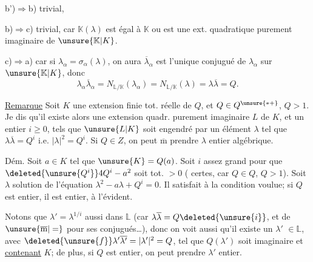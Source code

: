 b')$\Rightarrow$b) trivial, 

b)$\Rightarrow$c) trivial, car $\mathbb K(\lambda)$ est égal à $\mathbb K$ ou est une ext. quadratique purement imaginaire de $\unsure{\mathbb K|K}$.

c)$\Longrightarrow$a) car si $\lambda_\alpha=\sigma_\alpha(\lambda)$, on aura   $\overline\lambda_\alpha$ est l'unique \deleted{\unsure{$\lambda$}} conjugué de $\lambda_\alpha$ sur $\unsure{\mathbb K|K}$,  donc
\[
\lambda_\alpha\overline\lambda_\alpha=N_{\mathbb L/\mathbb K}(\lambda_\alpha)=N_{\mathbb L/\mathbb K}(\lambda)=\lambda\overline\lambda=Q.
\]


\uline{Remarque} Soit $K$ une extension finie tot. réelle de $Q$, et $Q\in Q^{\unsure{*+}}$, $Q>1$. Je dis qu'il existe alors une extension quadr. purement imaginaire $L$ de $K$,  et un entier $i\ge0$,  tels que $\unsure{L|K}$ soit engendré  par un élément $\lambda$ tel que $\lambda\overline\lambda=Q^i$ i.e. $|\lambda|^2=Q^i$. Si $Q\in Z$, on peut $\overline{\mathrm m}$ prendre $\lambda$ entier algébrique.

Dém. Soit $a\in K$ tel que $\unsure{K}=Q(a)$.  Soit $i$ assez grand pour que $\deleted{\unsure{Q^i}}4Q^i-a^2$ soit tot. $>0$ ( certes, car $Q\in Q$, $Q>1$). Soit $\lambda$ solution de l'équation $\lambda^2-a\lambda+Q^i=0$. Il satisfait à la condition voulue; si $Q$ est entier, il est entier, à l'évident.

Notons que $\lambda'=\lambda^{1/i}$  aussi dans $\mathbb L$ (car $\lambda\overline\lambda=Q\deleted{\unsure{i}}$, et de $\unsure{\overline{\mathrm m}|=}$ pour ses conjugués\ldots), donc on voit aussi qu'il existe un $\lambda'$  $\in\mathbb L$, avec $\deleted{\unsure{f}}\lambda'\overline{\lambda'}=|\lambda'|^2=Q$, tel que $Q(\lambda')$ soit   imaginaire et \uline{contenant} $K$; de plus, si $Q$ est entier, on peut prendre $\lambda'$ entier.

